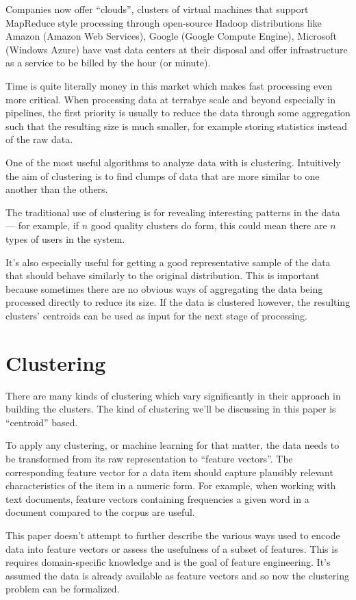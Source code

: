 \documentclass{article}
\begin{document}
Companies now offer ``clouds'', clusters of virtual machines that support
MapReduce style processing through open-source Hadoop distributions like Amazon
(Amazon Web Services), Google (Google Compute Engine), Microsoft (Windows
Azure) have vast data centers at their disposal and offer infrastructure as a
service to be billed by the hour (or minute).

Time is quite literally money in this market which makes fast processing even
more critical. When processing data at terrabye scale and beyond especially in
pipelines, the first priority is usually to reduce the data through some
aggregation such that the resulting size is much smaller, for example storing
statistics instead of the raw data.

One of the most useful algorithms to analyze data with is clustering.
Intuitively the aim of clustering is to find clumps of data that are more
similar to one another than the others.

The traditional use of clustering is for revealing interesting patterns in the
data --- for example, if $n$ good quality clusters do form, this could mean there
are $n$ types of users in the system.

It's also especially useful for getting a good representative sample of the data
that should behave similarly to the original distribution.
This is important because sometimes there are no obvious ways of aggregating the
data being processed directly to reduce its size. If the data is clustered
however, the resulting clusters' centroids can be used as input for the next
stage of processing.

\section{Clustering}

There are many kinds of clustering which vary significantly in their approach
in building the clusters. The kind of clustering we'll be discussing in this
paper is ``centroid'' based.

To apply any clustering, or machine learning for that matter, the data needs to
be transformed from its raw representation to ``feature vectors''. The
corresponding feature vector for a data item should capture plausibly relevant
characteristics of the item in a numeric form.
For example, when working with text documents, feature vectors containing
frequencies a given word in a document compared to the corpus are useful.

This paper doesn't attempt to further describe the various ways used to encode
data into feature vectors or assess the usefulness of a subset of features.
This is requires domain-specific knowledge and is the goal of feature engineering.
It's assumed the data is already available as feature vectors and so now
the clustering problem can be formalized.
\end{document}
